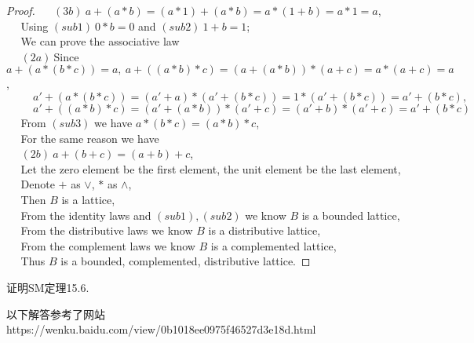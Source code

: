 \documentclass[11pt, a4paper, UTF8]{ctexart}
\begin{document}
\begin{proof}
  $~~~~~~(3b)~a + (a * b) = (a * 1) + (a * b) = a * (1 + b) = a * 1 = a$,\\
  $~~~~~~$Using $(sub1)~0 * b = 0$ and $(sub2)~1 + b = 1$;\\
  $~~~~~~$We can prove the associative law\\
  $~~~~~~(2a)~$Since $a + (a * (b * c)) = a,~a + ((a * b) * c) = (a + (a * b)) * (a + c) = a * (a + c) = a$,\\
  $~~~~~~~~~~~a' + (a * (b * c)) = (a' + a) * (a' + (b * c)) = 1 * (a' + (b * c)) = a' + (b * c),$\\
  $~~~~~~~~~~~a' + ((a * b) * c) = (a' + (a * b)) * (a' + c) = (a' + b) * (a' + c) = a' + (b * c)$\\
  $~~~~~~$From $(sub3)$ we have $a * (b * c) = (a * b) * c$,\\
  $~~~~~~$For the same reason we have\\
  $~~~~~~(2b)~a + (b + c) = (a + b) + c$,\\
  $~~~~~~$Let the zero element be the first element, the unit element be the 
  last element,\\
  $~~~~~~$Denote $+$ as $\vee$, $*$ as $\wedge$,\\
  $~~~~~~$Then $B$ is a lattice,\\
  $~~~~~~$From the identity laws and $(sub1),(sub2)$ we know $B$ is a bounded lattice,\\
  $~~~~~~$From the distributive laws we know $B$ is a distributive lattice,\\
  $~~~~~~$From the complement laws we know $B$ is a complemented lattice,\\
  $~~~~~~$Thus $B$ is a bounded, complemented, distributive lattice.
\end{proof}

\begin{problem}
  证明SM定理15.6.
\end{problem}

\begin{remark}
    以下解答参考了网站https://wenku.baidu.com/view/0b1018ee0975f46527d3e18d.html
\end{remark}
\end{document}
